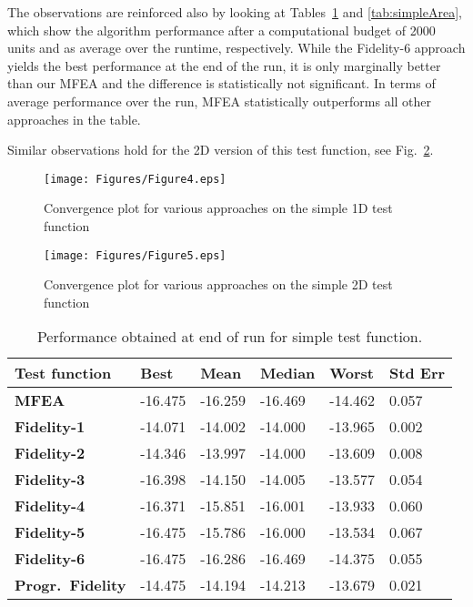 The observations are reinforced also by looking at Tables~\ref{tab:simpleFinal} and \ref{tab:simpleArea}, which show the algorithm performance after a computational budget of 2000 units and as average over the runtime, respectively. While the Fidelity-6 approach yields the best performance at the end of the run, it is only marginally better than our MFEA and the difference is statistically not significant. In terms of average performance over the run, MFEA statistically outperforms all other approaches in the table. 

Similar observations hold for the 2D version of this test function, see Fig.~\ref{fig:test2DForcing}.

\begin{figure}[!htb]
	\centering
	\texttt{[image: Figures/Figure4.eps]}
	\caption{Convergence plot for various approaches on the simple 1D test function}
	\label{fig:simple}
\end{figure} 

\begin{figure}[!htb]
	\centering
	\texttt{[image: Figures/Figure5.eps]}
	\caption{Convergence plot for various approaches on the simple 2D test function}
	\label{fig:test2DForcing}
\end{figure}



\begin{table}[!ht]\footnotesize
	\centering
	\caption{Performance obtained at end of run for simple test function.}
	\label{tab:simpleFinal}
	\begin{tabular}{l|l|l|l|l|l}
		\hline
		\textbf{Test function}        & \textbf{Best} & \textbf{Mean} & \textbf{Median} & \textbf{Worst} & \textbf{Std Err} \\ \hline
		\textbf{MFEA}           & -16.475       & -16.259       & -16.469         & -14.462        & 0.057              \\ 
		\textbf{Fidelity-1}           & -14.071       & -14.002       & -14.000         & -13.965        & 0.002              \\ 
		\textbf{Fidelity-2}           & -14.346       & -13.997       & -14.000         & -13.609        & 0.008              \\ 
		\textbf{Fidelity-3}           & -16.398       & -14.150       & -14.005         & -13.577        & 0.054              \\ 
		\textbf{Fidelity-4}           & -16.371       & -15.851       & -16.001         & -13.933        & 0.060              \\ 
		\textbf{Fidelity-5}           & -16.475       & -15.786       & -16.000         & -13.534        & 0.067              \\ 
		\textbf{Fidelity-6}           & -16.475       & -16.286       & -16.469         & -14.375        & 0.055              \\ 
		\textbf{Progr.\ Fidelity} & -14.475       & -14.194       & -14.213         & -13.679        & 0.021              \\ \hline
	\end{tabular}
\end{table}


